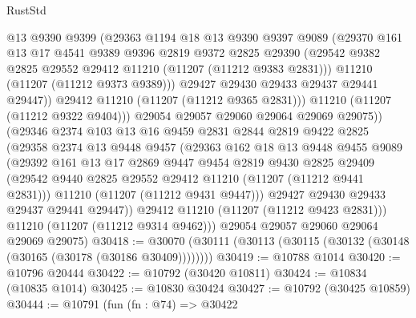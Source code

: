 \begin{lexlean}{RustStd}
\begin{coremodule}
                  @13
                  @9390
                  @9399
                  (@29363
                    @1194
                    @18
                    @13
                    @9390
                    @9397
                    @9089
                    (@29370
                      @161
                      @13
                      @17
                      @4541
                      @9389
                      @9396
                      @2819
                      @9372
                      @2825
                      @29390
                      (@29542 @9382 @2825 @29552 @29412 @11210 (@11207 (@11212 @9383 @2831)))
                      @11210
                      (@11207 (@11212 @9373 @9389)))
                    @29427
                    @29430
                    @29433
                    @29437
                    @29441
                    @29447))
                @29412
                @11210
                (@11207 (@11212 @9365 @2831)))
              @11210
              (@11207 (@11212 @9322 @9404)))
            @29054
            @29057
            @29060
            @29064
            @29069
            @29075))
        (@29346
          @2374
          @103
          @13
          @16
          @9459
          @2831
          @2844
          @2819
          @9422
          @2825
          (@29358
            @2374
            @13
            @9448
            @9457
            (@29363
              @162
              @18
              @13
              @9448
              @9455
              @9089
              (@29392
                @161
                @13
                @17
                @2869
                @9447
                @9454
                @2819
                @9430
                @2825
                @29409
                (@29542 @9440 @2825 @29552 @29412 @11210 (@11207 (@11212 @9441 @2831)))
                @11210
                (@11207 (@11212 @9431 @9447)))
              @29427
              @29430
              @29433
              @29437
              @29441
              @29447))
          @29412
          @11210
          (@11207 (@11212 @9423 @2831)))
        @11210
        (@11207 (@11212 @9314 @9462)))
      @29054
      @29057
      @29060
      @29064
      @29069
      @29075)
@30418 := @30070 (@30111 (@30113 (@30115 (@30132 (@30148 (@30165 (@30178 (@30186 @30409))))))))
@30419 := @10788 @1014
@30420 := @10796 @20444
@30422 := @10792 (@30420 @10811)
@30424 := @10834 (@10835 @1014)
@30425 := @10830 @30424
@30427 := @10792 (@30425 @10859)
@30444 := @10791
    (fun (fn : @74) =>
    @30422

\end{coremodule}
\end{lexlean}
